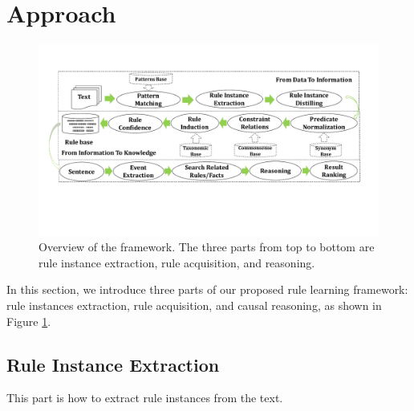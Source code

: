 \section{Approach}
\label{sec:approach}
\begin{figure}[htbp]
	\centering
	\includegraphics[width=\textwidth]{figures/approach}
	\caption{Overview of the framework. The three parts from top to bottom are rule instance extraction, rule acquisition, and reasoning.}
	\label{fig:approach}
\end{figure}
In this section, we introduce three parts of our proposed rule learning framework: rule instances extraction, rule acquisition, and causal reasoning, as shown in Figure \ref{fig:approach}.
\subsection{Rule Instance Extraction}
This part is how to extract rule instances from the text.

